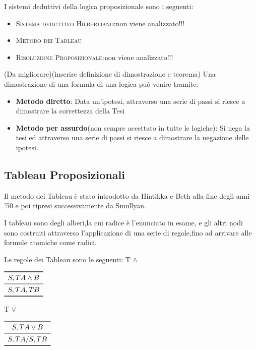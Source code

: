 I sistemi deduttivi della logica proposizionale sono i seguenti:

\begin{itemize}
  \item \textsc{Sistema deduttivo Hilbertiano}:non viene analizzato!!!
  \item \textsc{Metodo dei Tableau}
  \item \textsc{Risoluzione Proposizionale}:non viene analizzato!!!
\end{itemize}

(Da migliorare)(inserire definizione di dimostrazione e teorema)
Una dimostrazione di una formula di una logica può venire tramite:

\begin{itemize}
  \item  \textbf{Metodo diretto}: Data un'ipotesi, attraverso una serie di passi
          si riesce a dimostrare la correttezza della Tesi
  \item \textbf{Metodo per assurdo}(non sempre accettato in tutte le logiche):
        Si nega la tesi ed attraverso una serie di passi si riesce a dimostrare
        la negazione delle ipotesi.
\end{itemize}

\subsection{Tableau Proposizionali}
Il metodo dei Tableau è stato introdotto da Hintikka e Beth alla fine degli anni '50
e poi ripresi successivamente da Smullyan.

I tableau sono degli alberi,la cui radice è l'enunciato in esame, e gli altri nodi
sono costruiti attraverso l'applicazione di una serie di regole,fino ad arrivare
alle formule atomiche come radici.

Le regole dei Tableau sono le seguenti:\newline
T $\land$

$\begin{array}{c}
\toprule
S,T A \land B \\
\midrule
S, TA, TB \\
\bottomrule
\end{array}$

T $\lor$

$\begin{array}{c}
\toprule
S,T A \lor B \\
\midrule
S, TA/ S, TB \\
\bottomrule
\end{array}$

